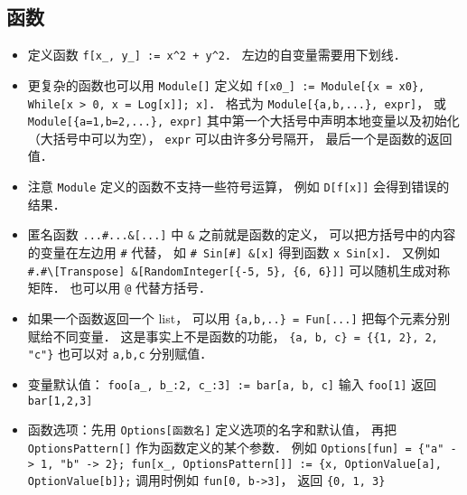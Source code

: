 \subsection{函数}
\begin{itemize}
\item 定义函数 \verb|f[x_, y_] := x^2 + y^2|． 左边的自变量需要用下划线．
\item 更复杂的函数也可以用 \verb|Module[]| 定义如 \verb|f[x0_] := Module[{x = x0}, While[x > 0, x = Log[x]]; x]|． 格式为 \verb|Module[{a,b,...}, expr]|， 或 \verb|Module[{a=1,b=2,...}, expr]| 其中第一个大括号中声明本地变量以及初始化（大括号中可以为空）， \verb|expr| 可以由许多分号隔开， 最后一个是函数的返回值．
\item 注意 \verb|Module| 定义的函数不支持一些符号运算， 例如 \verb|D[f[x]]| 会得到错误的结果．
\item 匿名函数 \verb|...#...&[...]| 中 \verb|&| 之前就是函数的定义， 可以把方括号中的内容的变量在左边用 \verb|#| 代替， 如 \verb|# Sin[#] &[x]| 得到函数 \verb|x Sin[x]|． 又例如 \verb|#.#\[Transpose] &[RandomInteger[{-5, 5}, {6, 6}]]| 可以随机生成对称矩阵． 也可以用 \verb|@| 代替方括号．
\item 如果一个函数返回一个 list， 可以用 \verb|{a,b,..} = Fun[...]| 把每个元素分别赋给不同变量． 这是事实上不是函数的功能， \verb|{a, b, c} = {{1, 2}, 2, "c"}| 也可以对 \verb|a,b,c| 分别赋值．
\item 变量默认值： \verb|foo[a_, b_:2, c_:3] := bar[a, b, c]| 输入 \verb|foo[1]| 返回 \verb|bar[1,2,3]|
\item 函数选项：先用 \verb|Options[函数名]| 定义选项的名字和默认值， 再把 \verb|OptionsPattern[]| 作为函数定义的某个参数． 例如 \verb|Options[fun] = {"a" -> 1, "b" -> 2}; fun[x_, OptionsPattern[]] := {x, OptionValue[a], OptionValue[b]};| 调用时例如 \verb|fun[0, b->3]|， 返回 \verb|{0, 1, 3}|
\end{itemize}

